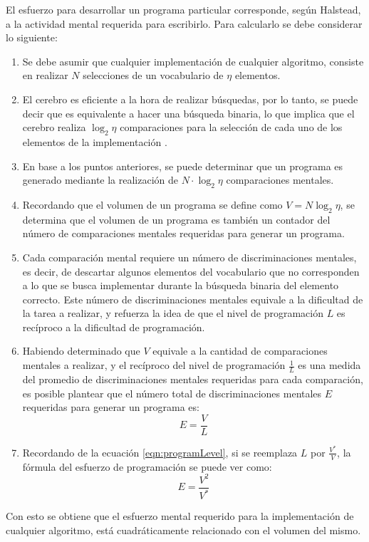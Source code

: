 \documentclass[letterpaper,12pt]{article}
\begin{document}
El esfuerzo para desarrollar un programa particular corresponde, según Halstead, a la actividad mental requerida para escribirlo. Para calcularlo se debe considerar lo siguiente:

\begin{enumerate}
  \item Se debe asumir que cualquier implementación de cualquier algoritmo, consiste en realizar $N$ selecciones de un vocabulario de $\eta$ elementos.
  \item El cerebro es eficiente a la hora de realizar búsquedas, por lo tanto, se puede decir que es equivalente a hacer una búsqueda binaria, lo que implica que el cerebro realiza $\log_{2}\eta$ comparaciones para la selección de cada uno de los elementos de la implementación \cite{10.5555/540137}.
  \item En base a los puntos anteriores, se puede determinar que un programa es generado mediante la realización de $N \cdot \log_{2}\eta$ comparaciones mentales.
  \item Recordando que el volumen de un programa se define como $V = N\log_{2}\eta$, se determina que el volumen de un programa es también un contador del número de comparaciones mentales requeridas para generar un programa.
  \item Cada comparación mental requiere un número de discriminaciones mentales, es decir, de descartar algunos elementos del vocabulario que no corresponden a lo que se busca implementar durante la búsqueda binaria del elemento correcto. Este número de discriminaciones mentales equivale a la dificultad de la tarea a realizar, y refuerza la idea de que el nivel de programación $L$ es recíproco a la dificultad de programación.
  \item Habiendo determinado que $V$ equivale a la cantidad de comparaciones mentales a realizar, y el recíproco del nivel de programación $\frac{1}{L}$ es una medida del promedio de discriminaciones mentales requeridas para cada comparación, es posible plantear que el número total de discriminaciones mentales $E$ requeridas para generar un programa es:
        \begin{equation}
          E = \frac{V}{L}
        \end{equation}
  \item Recordando de la ecuación \ref{eqn:programLevel}, si se reemplaza $L$ por $\frac{V^{*}}{V}$, la fórmula del esfuerzo de programación se puede ver como:
        \begin{equation}
          \label{eqn:programEffort}
          E = \frac{V^{2}}{V^{*}}
        \end{equation}
\end{enumerate}
Con esto se obtiene que el esfuerzo mental requerido para la implementación de cualquier algoritmo, está cuadráticamente relacionado con el volumen del mismo.
\end{document}
